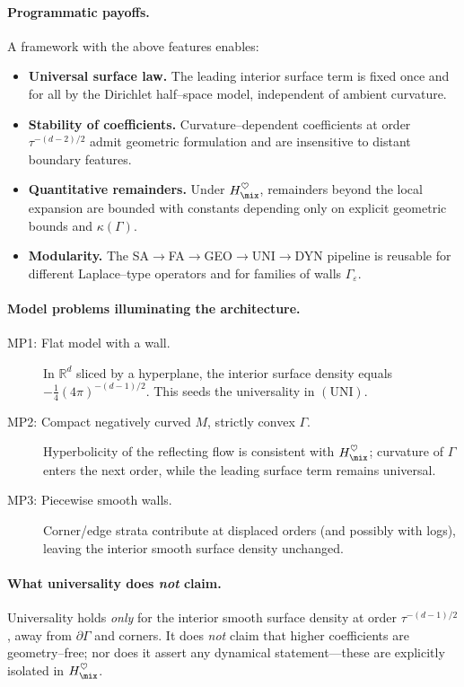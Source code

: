 \paragraph{Programmatic payoffs.}
A framework with the above features enables:
\begin{itemize}
  \item \textbf{Universal surface law.} The leading interior surface term is fixed once and for all by the Dirichlet half–space model, independent of ambient curvature.
  \item \textbf{Stability of coefficients.} Curvature–dependent coefficients at order $\tau^{-(d-2)/2}$ admit geometric formulation and are insensitive to distant boundary features.
  \item \textbf{Quantitative remainders.} Under $H_{\mix}^\heartsuit$, remainders beyond the local expansion are bounded with constants depending only on explicit geometric bounds and $\kappa(\Gamma)$.
  \item \textbf{Modularity.} The SA$\to$FA$\to$GEO$\to$UNI$\to$DYN pipeline is reusable for different Laplace–type operators and for families of walls $\Gamma_\varepsilon$.
\end{itemize}

\paragraph{Model problems illuminating the architecture.}
\begin{description}
  \item[MP1: Flat model with a wall.] In $\mathbb{R}^d$ sliced by a hyperplane, the interior surface density equals $-\tfrac14(4\pi)^{-(d-1)/2}$. This seeds the universality in $(\mathrm{UNI})$.
  \item[MP2: Compact negatively curved $M$, strictly convex $\Gamma$.] Hyperbolicity of the reflecting flow is consistent with $H_{\mix}^\heartsuit$; curvature of $\Gamma$ enters the next order, while the leading surface term remains universal.
  \item[MP3: Piecewise smooth walls.] Corner/edge strata contribute at displaced orders (and possibly with logs), leaving the interior smooth surface density unchanged.
\end{description}

\paragraph{What universality does \emph{not} claim.}
Universality holds \emph{only} for the interior smooth surface density at order $\tau^{-(d-1)/2}$, away from $\partial\Gamma$ and corners. It does \emph{not} claim that higher coefficients are geometry–free; nor does it assert any dynamical statement—these are explicitly isolated in $H_{\mix}^\heartsuit$.

